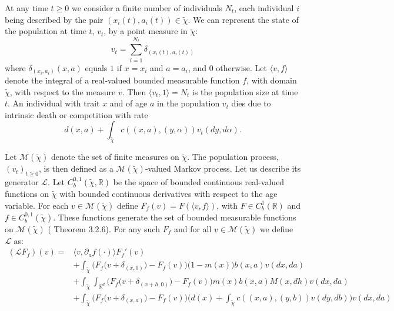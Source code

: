\documentclass[11pt, a4paper]{article}
\theoremstyle{definition}
\begin{document}
    At any time $t\geq 0$ we consider a finite number of individuals $N_t$, each individual $i$ being described by the pair $(x_i(t), a_i(t)) \in \tilde{\chi}$. We can represent the state of the population at time $t$, $v_t$, by a point measure in $\tilde{\chi}$:
    \begin{equation}
        v_t = \sum_{i=1}^{N_t} \delta_{(x_i(t), a_i(t))}
    \end{equation}
    where $\delta_{(x_i, a_i)}(x,a)$ equals $1$ if $x=x_i$ and $ a=a_i$, and $0$ otherwise.
    Let $\langle v,f \rangle$ denote the integral of a real-valued bounded measurable function $f$, with domain $\tilde{\chi}$, with respect to the measure $v$. Then $\langle v_t,1 \rangle = N_t$ is the population size at time $t$. An individual with trait $x$ and of age $a$ in the population $v_t$ dies due to intrinsic death or competition with rate
    \begin{equation}
        d(x,a) + \int_{\tilde{\chi}} c((x,a),(y,\alpha)) v_t(dy,d\alpha).
    \end{equation}


    Let $\mathcal{M}(\tilde{\chi})$ denote the set of finite measures on $\tilde{\chi}$. The population process, $(v_t)_{t\geq 0}$, is then defined as a $\mathcal{M}(\tilde{\chi})$-valued Markov process.
    Let us describe its generator $\mathcal{L}$. Let $C_b^{0,1}(\tilde{\chi},\mathbb{R})$ be the space of bounded continuous real-valued functions on $\tilde{\chi}$ with bounded continuous derivatives with respect to the age variable. For each $v \in \mathcal{M}(\tilde{\chi})$ define $F_f(v) = F(\langle v,f\rangle)$, with $F\in C^1_b(\mathbb{R})$ and $f\in C_b^{0,1}(\tilde{\chi})$.
    These functions generate the set  of bounded measurable functions on $\mathcal{M}(\tilde{\chi})$ (\cite{dawson1993} Theorem 3.2.6).
    For any such $F_f$ and for all $v\in \mathcal{M}(\tilde{\chi})$ we define $\mathcal{L}$ as:
    \begin{align}
        (\mathcal{L}F_f)(v) = &\langle v, \partial_a f(\cdot) \rangle F_f'(v) \nonumber \\
        &+ \int_{\tilde{\chi}} \Big ( F_f\big ( v+\delta_{(x,0)} \big ) - F_f(v) \Big ) \big ( 1-m(x) \big ) b(x,a) v(dx,da) \nonumber \\
        &+ \int_{\tilde{\chi}} \int_{\mathbb{R}^d} \Big ( F_f\big ( v+\delta_{(x+h,0)} \big ) - F_f(v) \Big ) m(x)b(x,a) M(x,dh) v(dx,da) \\
        &+ \int_{\tilde{\chi}} \Big ( F_f\big ( v+\delta_{(x,a)} \big ) - F_f(v) \Big ) \big ( d(x) + \int_{\tilde{\chi}} c((x,a), (y,b)) v(dy,db) \big ) v(dx,da) \nonumber
    \end{align}
\end{document}
